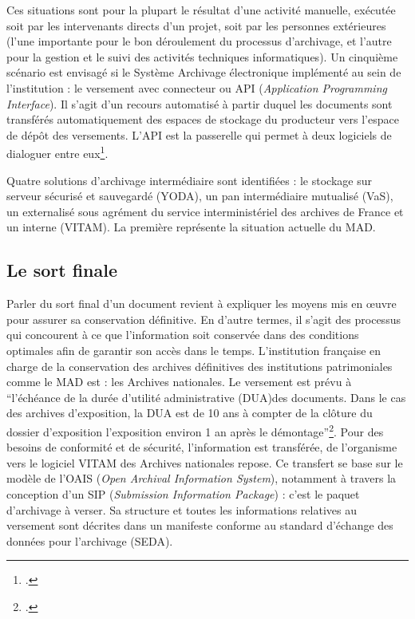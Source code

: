 Ces situations sont pour la plupart le résultat d'une activité manuelle, exécutée soit par les intervenants directs d'un projet, soit par les personnes extérieures (l'une importante pour le bon déroulement du processus d'archivage, et l'autre pour la gestion et le suivi des activités techniques informatiques). Un cinquième scénario est envisagé si le Système Archivage électronique implémenté au sein de l'institution : le versement avec connecteur ou API (\textit{Application Programming Interface}). Il s'agit d'un recours automatisé à partir duquel les documents sont transférés automatiquement des espaces de stockage du producteur vers l'espace de dépôt des versements. L'API est la passerelle qui permet à deux logiciels de dialoguer entre eux\footnote{\cite{orange-api-2025}.}.

Quatre solutions d'archivage intermédiaire sont identifiées : le stockage sur serveur sécurisé et sauvegardé (YODA), un pan intermédiaire mutualisé (VaS), un externalisé sous agrément du service interministériel des archives de France et un interne (VITAM). La première représente la situation actuelle du MAD.


\subsection*{Le sort finale }

Parler du sort final d'un document revient à expliquer les moyens mis en œuvre pour assurer sa conservation définitive. En d'autre termes, il s'agit des processus qui concourent à ce que l'information soit conservée dans des conditions optimales afin de garantir son accès dans le temps. L'institution française en charge de la conservation des archives définitives des institutions patrimoniales comme le MAD est : les Archives nationales. Le versement est prévu à \enquote{l’échéance de la durée d’utilité administrative (DUA)des documents. Dans le cas des archives d’exposition, la DUA est de 10 ans à compter de la clôture du dossier d’exposition l’exposition environ 1 an après le démontage}\footcite[version 2, p.~4]{bomel-dion-note-cadrage}. Pour des besoins de conformité et de sécurité, l'information est transférée, de l'organisme vers le logiciel VITAM des Archives nationales repose. Ce transfert se base sur le modèle de l'OAIS (\textit{Open Archival Information System}), notamment à travers la conception d'un SIP (\textit{Submission Information Package}) : c'est le paquet d'archivage à verser. Sa structure et toutes les informations relatives au versement sont décrites dans un manifeste conforme au standard d'échange des données pour l'archivage (SEDA). 


